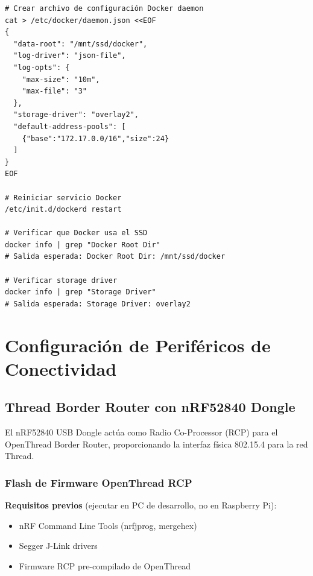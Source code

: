 \begin{verbatim}
# Crear archivo de configuración Docker daemon
cat > /etc/docker/daemon.json <<EOF
{
  "data-root": "/mnt/ssd/docker",
  "log-driver": "json-file",
  "log-opts": {
    "max-size": "10m",
    "max-file": "3"
  },
  "storage-driver": "overlay2",
  "default-address-pools": [
    {"base":"172.17.0.0/16","size":24}
  ]
}
EOF

# Reiniciar servicio Docker
/etc/init.d/dockerd restart

# Verificar que Docker usa el SSD
docker info | grep "Docker Root Dir"
# Salida esperada: Docker Root Dir: /mnt/ssd/docker

# Verificar storage driver
docker info | grep "Storage Driver"
# Salida esperada: Storage Driver: overlay2
\end{verbatim}

\section{Configuración de Periféricos de Conectividad}

\subsection{Thread Border Router con nRF52840 Dongle}

El nRF52840 USB Dongle actúa como Radio Co-Processor (RCP) para el OpenThread Border Router, proporcionando la interfaz física 802.15.4 para la red Thread.

\subsubsection{Flash de Firmware OpenThread RCP}

\textbf{Requisitos previos} (ejecutar en PC de desarrollo, no en Raspberry Pi):
\begin{itemize}
    \item nRF Command Line Tools (nrfjprog, mergehex)
    \item Segger J-Link drivers
    \item Firmware RCP pre-compilado de OpenThread
\end{itemize}

